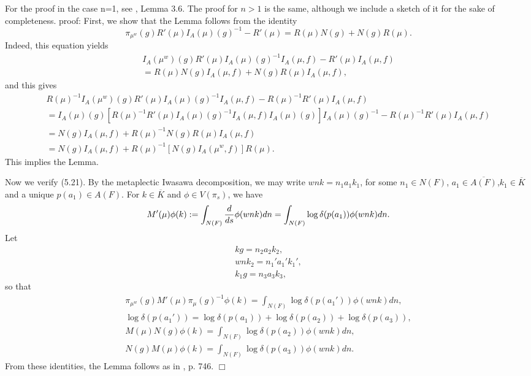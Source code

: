 For the proof in the case n=1, see \cite{LL}, Lemma 3.6.
The proof for $n>1$ is the same, although we include a sketch of
it for the sake of completeness.
proof: First, we show that the Lemma follows from the identity
\begin{equation}
\pi_{{\mu}^w}(g)R'({\mu})I_A(\mu)(g)^{-1}-R'(\mu)
=R(\mu)N(g)+N(g)R(\mu).
\end{equation}
Indeed, this equation yields
\[
\begin{array}{c}
I_A(\mu^w)(g)R'({\mu})I_A(\mu)(g)^{-1}
I_A(\mu,f)-R'(\mu)I_A(\mu,f)\\
=R(\mu)N(g)I_A(\mu,f)+
N(g)R(\mu)I_A(\mu,f),
\end{array}
\]
and this gives
\[
\begin{array}{c}
R({\mu})^{-1}I_A(\mu^w)(g)R'({\mu})
I_A(\mu)(g)^{-1}I_A(\mu,f)
-R(\mu)^{-1}R'(\mu)I_A(\mu,f)\\
=I_A(\mu)(g)[R(\mu)^{-1}R'({\mu})
I_A(\mu)(g)^{-1}
I_A(\mu,f)I_A(\mu)(g)]I_A(\mu)(g)^{-1}
-R(\mu)^{-1}R'(\mu)I_A(\mu,f)\\
=N(g)I_A(\mu,f)
+R(\mu)^{-1}N(g)R(\mu)I_A(\mu,f)\\
=N(g)I_A(\mu,f)+R(\mu)^{-1}
[N(g)I_A(\mu^w,f)]R(\mu).
\end{array}
\]
This implies the Lemma.
\par
Now we verify (5.21). By the metaplectic Iwasawa decomposition, we
may write $wnk=n_1a_1k_1$, for some $n_1\in N(F)$,
$a_1\in\overline{A(F)}$,$k_1\in\overline{K}$ and a unique $p(a_1)\in A(F)$.
For $k\in\overline{K}$ and $\phi\in V(\pi_s)$, we have
$$
M'(\mu)\phi (k):=\int_{N(F)}{d\over ds}\phi (wnk)dn=
\int_{N(F)}\log \delta(p(a_1))\phi (wnk)dn.
$$
Let
\[
\begin{array}{c}
kg=n_2a_2k_2,\\
wnk_2=n_1'a_1'k_1',\\
k_1g=n_3a_3k_3,
\end{array}
\]
so that
\[
\begin{array}{c}
\pi_{{\mu}^w}(g)M'(\mu)\pi_{{\mu}}(g)^{-1}\phi (k)
=\int_{N(F)}\log \delta(p(a_1'))\phi (wnk)dn,\\
\log \delta (p(a_1'))
=\log \delta (p(a_1))+\log \delta (p(a_2))+\log \delta (p(a_3)),\\
M(\mu)N(g)\phi (k)
=\int_{N(F)}\log \delta(p(a_2))\phi (wnk)dn,\\
N(g)M(\mu)\phi (k)
=\int_{N(F)}\log \delta(p(a_3))\phi (wnk)dn.
\end{array}
\]
From these identities, the Lemma follows as in \cite{LL}, p. 746.
$\Box$

